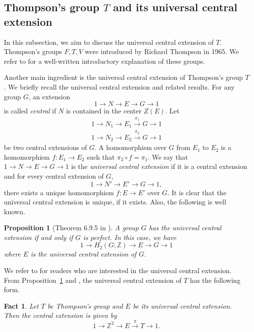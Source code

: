 \documentclass[11pt]{amsart}
\newtheorem{prop}[thm]{Proposition}
\newtheorem{fact}[thm]{Fact}
\theoremstyle{definition}
\newcommand{\ZZ}{\mathbb{Z}}
\begin{document}
\subsection{Thompson's group $T$ and its universal central extension} \label{subsec:UCET}

In this subsection, we aim to discuss the universal central extension of $T$.
Thompson’s groups $F,T,V$ were introduced by Richard Thompson in 1965.
We refer to \cite{cannon1996introductory} for a well-written introductory explanation of these groups.

Another main ingredient is the universal central extension of Thompson's group $T$.
We briefly recall the universal central extension and related results.
For any group $G$, an extension $$1 \to N \to E \to G \to 1$$ is called \emph{central} if $N$ is contained in the center $Z(E)$.
Let 
\begin{align*}
1 \to N_1 \to E_1 \overset{\pi_1}{\to} G \to 1 \\
1 \to N_2 \to E_2 \overset{\pi_2}{\to} G \to 1
\end{align*}
be two central extensions of $G$.
A homomorphism over $G$ from $E_1$ to $E_2$ is a homomorphism $f:E_1 \to E_2$ such that $\pi_2 \circ f = \pi_1$.
We say that $1 \to N \to E \to G \to 1$ is the \emph{universal central extension} if it is a central extension and for every central extension of $G$, $$ 1 \to N' \to E' \to G \to 1, $$
there exists a unique homomorphism $f:E \to E'$ over $G$.
It is clear that the universal central extension is unique, if it exists.
Also, the following is well known.

\begin{prop}[Theorem 6.9.5 in \cite{Weibel_1994}] \label{prop:AboutUCE}
 A group $G$ has the universal central extension if and only if $G$ is perfect.
 In this case, we have $$ 1 \to H_2(G;\ZZ) \to E \to G \to 1 $$
 where $E$ is the universal central extension of $G$.
\end{prop}
We refer to \cite[Section 6.9]{Weibel_1994} for readers who are interested in the universal central extension.
From Proposition~\ref{prop:AboutUCE} and \cite{heuer2021spectrum}, the universal central extension of $T$ has the following form.

\begin{fact}
 Let $T$ be Thompson's group and $E$ be its universal central extension.
 Then the central extension is given by
 $$ 1 \to \ZZ^2 \to E \overset{\pi}{\to} T \to 1. $$
\end{fact}
\end{document}
